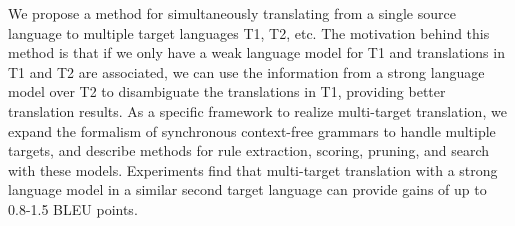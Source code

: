 We propose a method for simultaneously translating from a single source language to multiple target languages T1, T2, etc. The motivation behind this method is that if we only have a weak language model for T1 and translations in T1 and T2 are associated, we can use the information from a strong language model over T2 to disambiguate the translations in T1, providing better translation results. As a specific framework to realize multi-target translation, we expand the formalism of synchronous context-free grammars to handle multiple targets, and describe methods for rule extraction, scoring, pruning, and search with these models. Experiments find that multi-target translation with a strong language model in a similar second target language can provide gains of up to 0.8-1.5 BLEU points.
